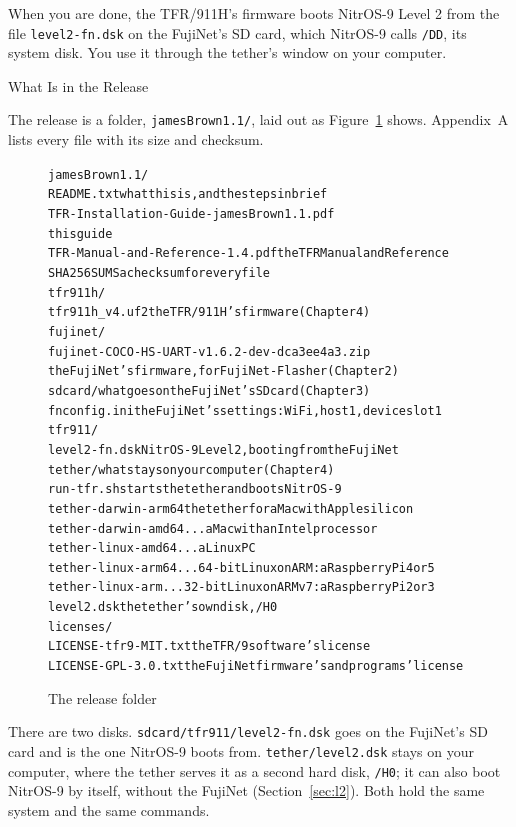 \documentclass[10pt,twoside,openany]{book}
\makeatletter
\newcommand{\release}{jamesBrown1.1}
\newcommand{\file}[1]{\texttt{#1}}           %
\newenvironment{exsmall}{\par\vspace{0.3ex}\scriptsize\begin{alltt}}{\end{alltt}\vspace{0.3ex}}
\renewcommand{\section}{\@startsection{section}{1}{0pt}{3.2ex plus 1ex}{1.2ex}%
  {\sffamily\bfseries\large}}
\makeatother
\begin{document}
When you are done, the TFR/911H's firmware boots NitrOS-9 Level 2 from
the file \file{level2-fn.dsk} on the FujiNet's SD card, which NitrOS-9
calls \file{/DD}, its system disk. You use it through the tether's window
on your computer.

\section{What Is in the Release}

The release is a folder, \file{\release/}, laid out as
Figure~\ref{fig:tree} shows. Appendix~A lists every file with its size and
checksum.

\begin{figure}[htbp]
\begin{exsmall}
\release/
  README.txt                       what this is, and the steps in brief
  TFR-Installation-Guide-\release.pdf
                                   this guide
  TFR-Manual-and-Reference-1.4.pdf the TFR Manual and Reference
  SHA256SUMS                       a checksum for every file
  tfr911h/
    tfr911h_v4.uf2                 the TFR/911H's firmware                     (Chapter 4)
  fujinet/
    fujinet-COCO-HS-UART-v1.6.2-dev-dca3ee4a3.zip
                                   the FujiNet's firmware, for FujiNet-Flasher (Chapter 2)
  sdcard/                          what goes on the FujiNet's SD card          (Chapter 3)
    fnconfig.ini                   the FujiNet's settings: WiFi, host 1, device slot 1
    tfr911/
      level2-fn.dsk                NitrOS-9 Level 2, booting from the FujiNet
  tether/                          what stays on your computer                 (Chapter 4)
    run-tfr.sh                     starts the tether and boots NitrOS-9
    tether-darwin-arm64            the tether for a Mac with Apple silicon
    tether-darwin-amd64            ... a Mac with an Intel processor
    tether-linux-amd64             ... a Linux PC
    tether-linux-arm64             ... 64-bit Linux on ARM: a Raspberry Pi 4 or 5
    tether-linux-arm               ... 32-bit Linux on ARMv7: a Raspberry Pi 2 or 3
    level2.dsk                     the tether's own disk, /H0
  licenses/
    LICENSE-tfr9-MIT.txt           the TFR/9 software's license
    LICENSE-GPL-3.0.txt            the FujiNet firmware's and programs' license
\end{exsmall}
\caption{The release folder}\label{fig:tree}
\end{figure}

There are two disks. \file{sdcard/tfr911/level2-fn.dsk} goes on the
FujiNet's SD card and is the one NitrOS-9 boots from. \file{tether/level2.dsk}
stays on your computer, where the tether serves it as a second hard disk,
\file{/H0}; it can also boot NitrOS-9 by itself, without the FujiNet
(Section~\ref{sec:l2}). Both hold the same system and the same commands.
\end{document}
